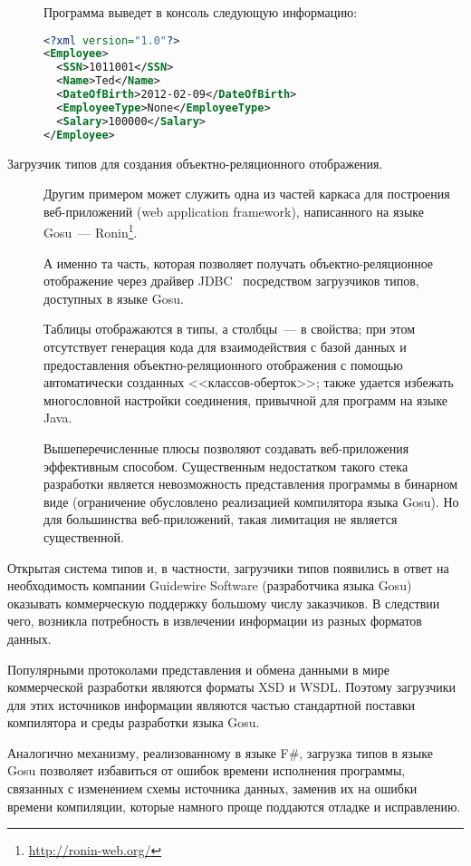 \begin{description}
\begin{code}
Программа выведет в консоль следующую информацию:
\begin{lstlisting}[language=xml, caption={Результат работы программы \ref{gosu-xsd-loader}.}, label=gosu-xsd-loader-result]
<?xml version="1.0"?>
<Employee>
  <SSN>1011001</SSN>
  <Name>Ted</Name>
  <DateOfBirth>2012-02-09</DateOfBirth>
  <EmployeeType>None</EmployeeType>
  <Salary>100000</Salary>
</Employee>
\end{lstlisting}

\end{code}


\item[Загрузчик типов для создания объектно-реляционного отображения.] Другим примером может служить одна из частей каркаса для построения веб-приложений (web application framework), написанного на языке Gosu~--- Ronin\footnote{\url{http://ronin-web.org/}}.

А именно та часть, которая позволяет получать объектно-реляционное отображение через драйвер JDBC~\cite{jdbc-book} посредством загрузчиков типов, доступных в языке Gosu.

Таблицы отображаются в типы, а столбцы~--- в свойства; при этом отсутствует генерация кода для взаимодействия с базой данных и предоставления объектно-реляционного отображения с помощью автоматически созданных <<классов-оберток>>; также удается избежать многословной настройки соединения, привычной для программ на языке Java.

Вышеперечисленные плюсы позволяют создавать веб-приложения эффективным способом. Существенным недостатком такого стека разработки является невозможность представления программы в бинарном виде (ограничение обусловлено реализацией компилятора языка Gosu). Но для большинства веб-приложений, такая лимитация не является существенной.

\end{description}

Открытая система типов и, в частности, загрузчики типов появились в ответ на необходимость компании Guidewire Software (разработчика языка Gosu) оказывать коммерческую поддержку большому числу заказчиков.
В следствии чего, возникла потребность в извлечении информации из разных форматов данных.

Популярными протоколами представления и обмена данными в мире коммерческой разработки являются форматы XSD и WSDL. Поэтому загрузчики для этих источников информации являются частью стандартной поставки компилятора и среды разработки языка Gosu.

Аналогично механизму, реализованному в языке F\#, загрузка типов в языке Gosu позволяет избавиться от ошибок времени исполнения программы, связанных с изменением схемы источника данных, заменив их на ошибки времени компиляции, которые намного проще поддаются отладке и исправлению.